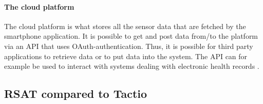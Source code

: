 \documentclass{cslthse-msc}
\begin{document}
\paragraph{The cloud platform} The cloud platform is what stores all the sensor data that are fetched by the smartphone application. It is possible to get and post data from/to the platform via an API that uses OAuth-authentication. Thus, it is possible for third party applications to retrieve data or to put data into the system. The API can for example be used to interact with systems dealing with electronic health records \cite{tactio2014} \cite{TactioWebsite}.







\subsection{RSAT compared to Tactio}
\end{document}
